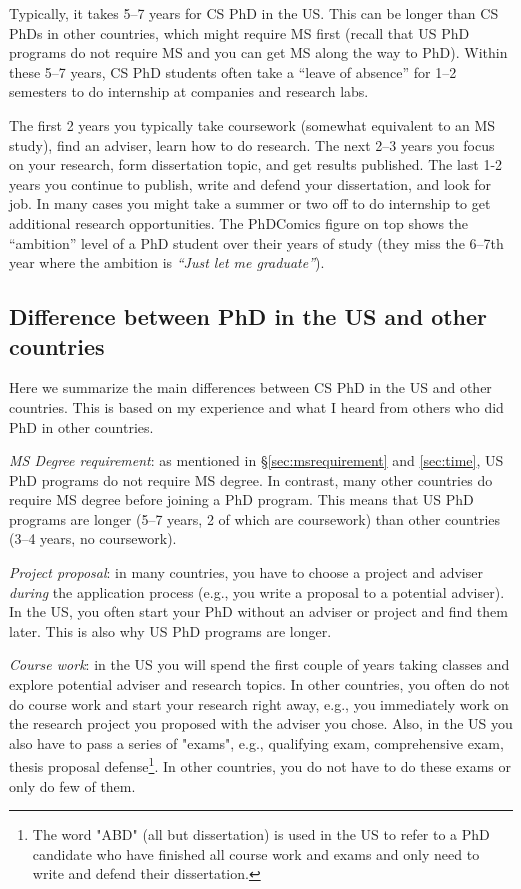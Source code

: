 \documentclass[11pt]{article}
\begin{document}
    Typically, it takes 5--7 years for CS PhD in the US.  This can be longer than CS PhDs in other countries, which might require MS first (recall that US PhD programs do not require MS and you can get MS along the way to PhD). Within these 5--7 years, CS PhD students often take a ``leave of absence'' for 1--2 semesters to do internship at companies and research labs. 
    
    The first 2 years you typically take coursework (somewhat equivalent to an MS study), find an adviser, learn how to do research.  The next 2--3 years you focus on your research, form dissertation topic, and get results published. The last 1-2 years you continue to publish, write and defend your dissertation, and look for job. 
    In many cases you might take a summer or two off to do internship to get additional research opportunities.
    The PhDComics figure on top shows the ``ambition'' level of a PhD student over their years of study (they miss the 6--7th year where the ambition is \emph{``Just let me graduate''}).


\subsection{Difference between PhD in the US and other countries}\label{sec:non-us-differences}
Here we summarize the main differences between CS PhD in the US and other countries.  This is based on my experience and what I heard from others who did PhD in other countries. 

\emph{MS Degree requirement}:  as mentioned in \S\ref{sec:msrequirement} and \ref{sec:time}, US PhD programs do not require MS degree.  In contrast, many other countries do require MS degree before joining a PhD program.  This means that US PhD programs are longer (5--7 years, 2 of which are coursework) than other countries (3--4 years, no coursework).  

\emph{Project proposal}: in many countries, you have to choose a project and adviser \emph{during} the application process (e.g., you write a proposal to a potential adviser). In the US, you often start your PhD without an adviser or project and find them later. This is also why US PhD programs are longer.

\emph{Course work}: in the US you will spend the first couple of years taking classes and explore potential adviser and research topics. In other countries, you often do not do course work and start your research right away, e.g., you immediately work on the research project you proposed with the adviser you chose. Also, in the US you also have to pass a series of "exams", e.g., qualifying exam, comprehensive exam, thesis proposal defense\footnote{The word "ABD" (all but dissertation) is used in the US to refer to a PhD candidate who have finished all course work and exams and only need to write and defend their dissertation.}. In other countries, you do not have to do these exams or only do few of them.
\end{document}
